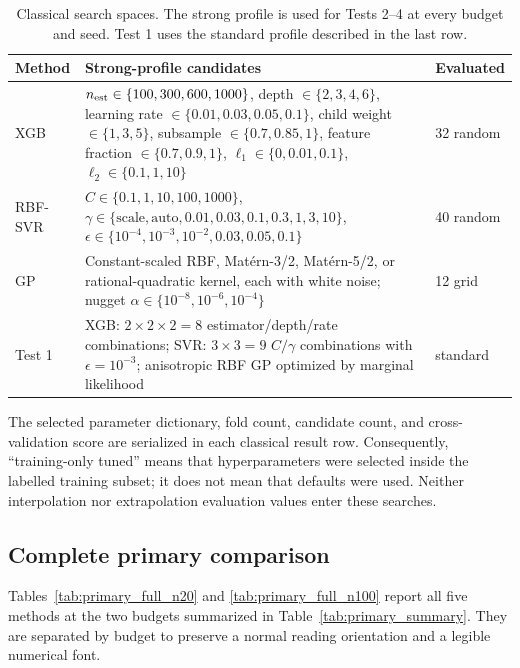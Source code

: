 \begin{table}[!htbp]
\centering
\small
\setlength{\tabcolsep}{3pt}
\caption{Classical search spaces. The strong profile is used for Tests 2--4 at every budget and seed. Test 1 uses the standard profile described in the last row.}
\label{tab:classical_search}
\begin{tabular}{p{}p{}p{}}
\toprule
Method & Strong-profile candidates & Evaluated\\
\midrule
XGB & \(n_{\rm est}\in\{100,300,600,1000\}\), depth \(\in\{2,3,4,6\}\), learning rate \(\in\{0.01,0.03,0.05,0.1\}\), child weight \(\in\{1,3,5\}\), subsample \(\in\{0.7,0.85,1\}\), feature fraction \(\in\{0.7,0.9,1\}\), \(\ell_1\in\{0,0.01,0.1\}\), \(\ell_2\in\{0.1,1,10\}\) & 32 random\\
RBF-SVR & \(C\in\{0.1,1,10,100,1000\}\), \(\gamma\in\{\text{scale},\text{auto},0.01,0.03,0.1,0.3,1,3,10\}\), \(\epsilon\in\{10^{-4},10^{-3},10^{-2},0.03,0.05,0.1\}\) & 40 random\\
GP & Constant-scaled RBF, Mat\'ern-3/2, Mat\'ern-5/2, or rational-quadratic kernel, each with white noise; nugget \(\alpha\in\{10^{-8},10^{-6},10^{-4}\}\) & 12 grid\\
Test 1 & XGB: \(2\times2\times2=8\) estimator/depth/rate combinations; SVR: \(3\times3=9\) \(C/\gamma\) combinations with \(\epsilon=10^{-3}\); anisotropic RBF GP optimized by marginal likelihood & standard\\
\bottomrule
\end{tabular}
\end{table}

The selected parameter dictionary, fold count, candidate count, and cross-validation score are serialized in each classical result row. Consequently, ``training-only tuned'' means that hyperparameters were selected inside the labelled training subset; it does not mean that defaults were used. Neither interpolation nor extrapolation evaluation values enter these searches.

\subsection{Complete primary comparison}
\label{app:primary_tables}

Tables~\ref{tab:primary_full_n20} and \ref{tab:primary_full_n100} report all five methods at the two budgets summarized in Table~\ref{tab:primary_summary}. They are separated by budget to preserve a normal reading orientation and a legible numerical font.

